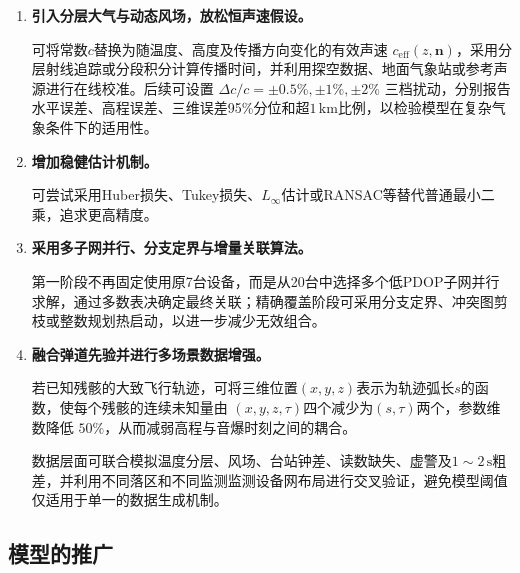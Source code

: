 \documentclass[draft,12pt,a4paper]{ctexart}
\theoremstyle{definition}
\begin{document}
\begin{enumerate}[label=\arabic*.]

\item \textbf{引入分层大气与动态风场，放松恒声速假设。}

可将常数$c$替换为随温度、高度及传播方向变化的有效声速
$c_{\mathrm{eff}}(z,\boldsymbol{n})$，采用分层射线追踪或分段积分计算传播时间，并利用探空数据、地面气象站或参考声源进行在线校准。后续可设置
\textbf{$\Delta c/c=\pm0.5\%,\pm1\%,\pm2\%$}
三档扰动，分别报告水平误差、高程误差、三维误差95\%分位和超$1\,\mathrm{km}$比例，以检验模型在复杂气象条件下的适用性。

\item \textbf{增加稳健估计机制。}

可尝试采用Huber损失、Tukey损失、$L_{\infty}$估计或RANSAC等替代普通最小二乘，追求更高精度。

\item \textbf{采用多子网并行、分支定界与增量关联算法。}

第一阶段不再固定使用原7台设备，而是从20台中选择多个低PDOP子网并行求解，通过多数表决确定最终关联；精确覆盖阶段可采用分支定界、冲突图剪枝或整数规划热启动，以进一步减少无效组合。

\item \textbf{融合弹道先验并进行多场景数据增强。}

若已知残骸的大致飞行轨迹，可将三维位置$(x,y,z)$表示为轨迹弧长$s$的函数，使每个残骸的连续未知量由
$(x,y,z,\tau)$四个减少为$(s,\tau)$两个，参数维数降低
\textbf{$50\%$}，从而减弱高程与音爆时刻之间的耦合。

数据层面可联合模拟温度分层、风场、台站钟差、读数缺失、虚警及$1\sim2\,\mathrm{s}$粗差，并利用不同落区和不同监测监测设备网布局进行交叉验证，避免模型阈值仅适用于单一的数据生成机制。

\end{enumerate}


\subsection{模型的推广}
\end{document}
